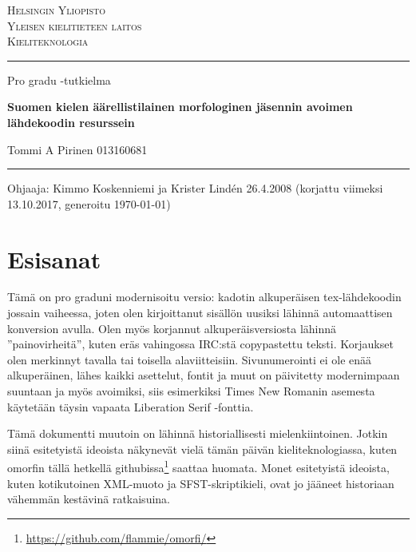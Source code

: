 \documentclass[free]{flammie}
\begin{document}
\parskip 2mm
\parindent 0mm

\begin{titlepage}
  \setlength{\parindent}{0mm}
  \sloppy
  \large \textsc{Helsingin Yliopisto \\
                 Yleisen kielitieteen laitos \\
                 Kieliteknologia}
  \vspace{5mm}

  \hrule height3pt
  \vspace{20mm}

  \begin{center}
    \large Pro gradu -tutkielma
    \linebreak \vfill

    \huge \textbf{Suomen kielen äärellistilainen morfologinen jäsennin avoimen
lähdekoodin resurssein}
    \vspace{20mm}

    \Large Tommi A Pirinen \linebreak
    \normalsize 013160681  %
    \vfill

  \end{center}
  \hrule height2pt
  \vspace{15mm}

  Ohjaaja: Kimmo Koskenniemi ja Krister Lindén
  \hfill
  26.4.2008 (korjattu viimeksi 13.10.2017, generoitu
    \today)    %
\end{titlepage}

\tableofcontents

\pagebreak

\section*{Esisanat}

Tämä on pro graduni modernisoitu versio: kadotin alkuperäisen tex-lähdekoodin
jossain vaiheessa, joten olen kirjoittanut sisällön uusiksi lähinnä
automaattisen konversion avulla. Olen myös korjannut alkuperäisversiosta
lähinnä ''painovirheitä'', kuten eräs vahingossa IRC:stä copypastettu teksti.
Korjaukset olen merkinnyt tavalla tai toisella alaviitteisiin. Sivunumerointi
ei ole enää alkuperäinen, lähes kaikki asettelut, fontit ja muut on päivitetty
modernimpaan suuntaan ja myös avoimiksi, siis esimerkiksi Times New Romanin
asemesta käytetään täysin vapaata Liberation Serif -fonttia.

Tämä dokumentti muutoin on lähinnä historiallisesti mielenkiintoinen. Jotkin
siinä esitetyistä ideoista näkynevät vielä tämän päivän kieliteknologiassa,
kuten omorfin tällä hetkellä
githubissa\footnote{\url{https://github.com/flammie/omorfi/}} saattaa huomata.
Monet esitetyistä ideoista, kuten kotikutoinen XML-muoto ja SFST-skriptikieli,
ovat jo jääneet historiaan vähemmän kestävinä ratkaisuina.
\end{document}
